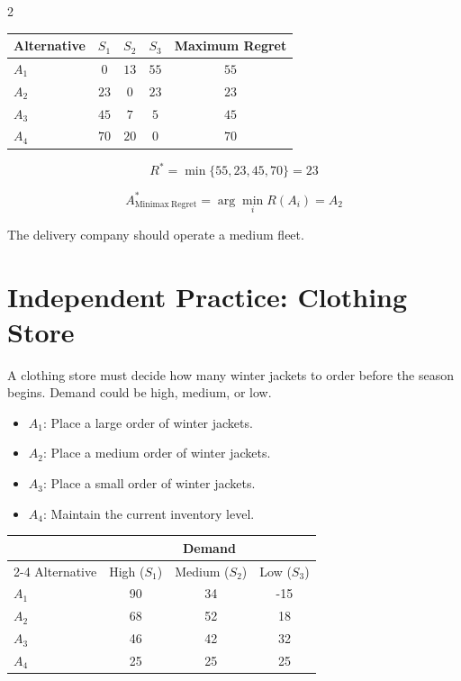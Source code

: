 \begin{multicols}{2}
		\begin{center}
			\renewcommand{\arraystretch}{1.5}
			\small
			\begin{tabular}{lcccc}
				\toprule
				Alternative & $S_1$ & $S_2$ & $S_3$ & Maximum Regret \\
				\midrule
				$A_1$ & $0$ & $13$ & $55$ & $55$ \\
				$A_2$ & $23$ & $0$ & $23$ & $23$ \\
				$A_3$ & $45$ & $7$ & $5$ & $45$ \\
				$A_4$ & $70$ & $20$ & $0$ & $70$ \\
				\bottomrule
			\end{tabular}
		\end{center}
		
		\[
		R^*
		=
		\min\{55,23,45,70\}
		=
		23
		\]
		
		\[
		A^*_{\mathrm{Minimax\ Regret}}
		=
		\arg\min_i R(A_i)
		=
		A_2
		\]
		
		The delivery company should operate a medium fleet.
		
		\section{Independent Practice: Clothing Store}
		
		A clothing store must decide how many winter jackets to order before the season begins.
		Demand could be high, medium, or low.
		\begin{itemize}
			\item $A_1$: Place a large order of winter jackets.
			\item $A_2$: Place a medium order of winter jackets.
			\item $A_3$: Place a small order of winter jackets.
			\item $A_4$: Maintain the current inventory level.
		\end{itemize}
		
		\begin{center}
			\renewcommand{\arraystretch}{1.3}
			\small
			\begin{tabular}{lccc}
				\toprule
				& \multicolumn{3}{c}{Demand} \\
				\cmidrule(lr){2-4}
				Alternative & High ($S_1$) & Medium ($S_2$) & Low ($S_3$) \\
				\midrule
				$A_1$ & 90 & 34 & -15 \\
				$A_2$ & 68 & 52 & 18 \\
				$A_3$ & 46 & 42 & 32 \\
				$A_4$ & 25 & 25 & 25 \\
				\bottomrule
			\end{tabular}
		\end{center}
		

\end{multicols}
